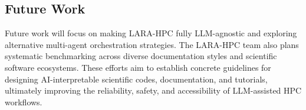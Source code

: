 \subsection*{Future Work}

Future work will focus on making LARA-HPC fully LLM-agnostic and exploring alternative multi-agent orchestration strategies. The LARA-HPC team also plans systematic benchmarking across diverse documentation styles and scientific software ecosystems. These efforts aim to establish concrete guidelines for designing AI-interpretable scientific codes, documentation, and tutorials, ultimately improving the reliability, safety, and accessibility of LLM-assisted HPC workflows.







